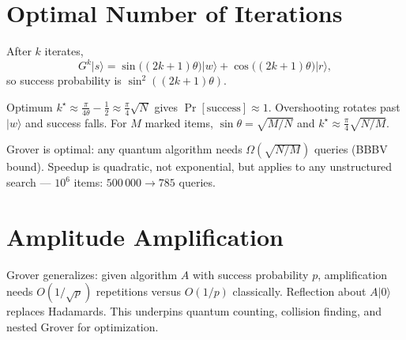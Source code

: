 \section{Optimal Number of Iterations}

After $k$ iterates,
\begin{equation}
G^k\lvert s\rangle=\sin\bigl((2k+1)\theta\bigr)\lvert w\rangle+\cos\bigl((2k+1)\theta\bigr)\lvert r\rangle,
\end{equation}
so success probability is $\sin^2((2k+1)\theta)$.

\begin{theorem}
Optimum $k^\star\approx\frac{\pi}{4\theta}-\frac12\approx\frac{\pi}{4}\sqrt N$ gives $\Pr[\text{success}]\approx1$. Overshooting rotates past $\lvert w\rangle$ and success falls. For $M$ marked items, $\sin\theta=\sqrt{M/N}$ and $k^\star\approx\frac{\pi}{4}\sqrt{N/M}$.
\end{theorem}

Grover is optimal: any quantum algorithm needs $\Omega(\sqrt{N/M})$ queries (BBBV bound). Speedup is quadratic, not exponential, but applies to any unstructured search ---  $10^6$ items: $500\,000\to 785$ queries.

\begin{center}
\end{center}

\section{Amplitude Amplification}
Grover generalizes: given algorithm $A$ with success probability $p$, amplification needs $O(1/\sqrt p)$ repetitions versus $O(1/p)$ classically. Reflection about $A\lvert0\rangle$ replaces Hadamards. This underpins quantum counting, collision finding, and nested Grover for optimization.


